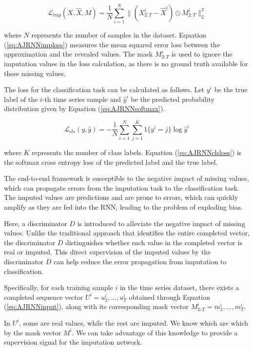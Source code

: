 \begin{equation}
  \mathcal{L}_{imp}(X, \hat{X}, M) = \frac{1}{N} \sum_{i=1}^N \lVert (X^i_{2:T} - \hat{X}^i) \odot M^i_{2:T} \rVert_2^2
  \label{eq:AJRNNimploss}
\end{equation}

where $N$ represents the number of samples in the dataset.
Equation (\ref{eq:AJRNNimploss}) measures the mean squared error loss between the approximation and the revealed values.
The mask $M^i_{2:T}$ is used to ignore the imputation values in the loss calculation, as there is no ground truth available for these missing values.


The loss for the classification task can be calculated as follows. 
Let $y^i$ be the true label of the $i$-th time series sample and $\hat{y}^i$ be the predicted probability distribution given by Equation (\ref{eq:AJRNNsoftmax}).

\begin{equation}
  \mathcal{L}_{cls}(y, \hat{y}) = - \frac{1}{N} \sum_{i=1}^N \sum_{j=1}^K 1\{ y^i = j\} \log\hat{y}^i 
  \label{eq:AJRNNclsloss}
\end{equation}

where $K$ represents the number of class labels. 
Equation (\ref{eq:AJRNNclsloss}) is the softmax cross entropy loss of the predicted label and the true label.

The end-to-end framework is susceptible to the negative impact of missing values, which can propagate errors from the imputation task to the classification task.
The imputed values are predictions and are prone to errors, which can quickly amplify as they are fed into the RNN, leading to the problem of exploding bias.

Here, a discriminator $D$ is introduced to alleviate the negative impact of missing values.  
Unlike the traditional approach that identifies the entire completed vector, the discriminator $D$ distinguishes whether each value in the completed vector is real or imputed.
This direct supervision of the imputed values by the discriminator $D$ can help reduce the error propagation from imputation to classification.

Specifically, for each training sample $i$ in the time series dataset, there exists a completed sequence vector $U^i = {u^i_2 , ..., u^i_T}$ obtained through Equation (\ref{eq:AJRNNinput}), along with its corresponding mask vector $M^i_{2:T} = {m^i_2, ..., m^i_T }$.

In $U^i$, some are real values, while the rest are imputed.
We know which are which by the mask vector $M^i$.
We can take advantage of this knowledge to provide a supervision signal for the imputation network.

